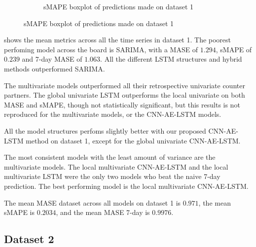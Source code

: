 \begin{figure}[h!]
\begin{subfigure}[b]{0.49\textwidth}
    \hfill
    \caption{sMAPE boxplot of predictions made on dataset 1}
    \label{fig:results:boxplot-mase-dataset-1-smape}

  \end{subfigure}
\end{figure}

 shows the mean metrics across
all the time series in dataset 1. The poorest perfoming model across the board
is SARIMA, with a MASE of $1.294$, sMAPE of $0.239$ and 7-day MASE of $1.063$.
All the different LSTM structures and hybrid methods outperformed SARIMA.

The multivariate models outperformed all their retrospective univariate counter partners.
The global univariate LSTM outperforms the local univariate on both MASE and sMAPE, though not statistically significant,
but this results is not reproduced for the multivariate models, or the CNN-AE-LSTM models.

All the model structures perfoms slightly better with our proposed CNN-AE-LSTM method on dataset 1, except for
the global univariate CNN-AE-LSTM.

The most consistent models with the least amount of variance are the multivariate models.
The local multivariate CNN-AE-LSTM and the local multivariate LSTM were the only two models
who beat the naive 7-day prediction. The best performing model is the local multivariate CNN-AE-LSTM.

The mean MASE dataset across all models on dataset 1 is $0.971$,
the mean sMAPE is $0.2034$,
and the mean MASE 7-day is $0.9976$.


\subsection{Dataset 2}

